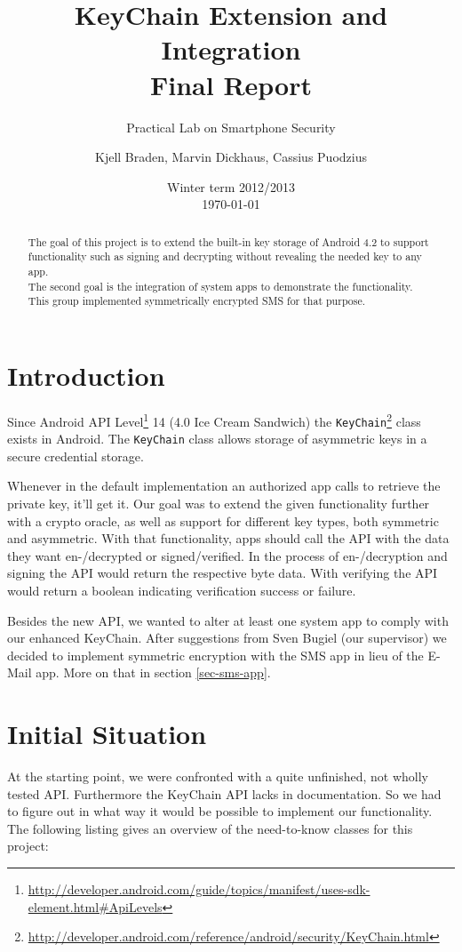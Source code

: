 \documentclass[a4paper,draft]{scrartcl}
\title{KeyChain Extension and Integration\\
	Final Report}
\subtitle{Practical Lab on Smartphone Security}
\author{Kjell Braden, Marvin Dickhaus, Cassius Puodzius}
\date{Winter term 2012/2013\\\today}
\begin{document}
\maketitle

\begin{abstract}
	The goal of this project is to extend the built-in key storage of Android 4.2 to support functionality such as signing and decrypting without revealing the needed key to any app.\\
	The second goal is the integration of system apps to demonstrate the functionality. This group implemented symmetrically encrypted SMS for that purpose.
\end{abstract}

\tableofcontents


\section{Introduction}
	Since Android API Level\footnote{\url{http://developer.android.com/guide/topics/manifest/uses-sdk-element.html\#ApiLevels}} 14 (4.0 Ice Cream Sandwich) the \texttt{KeyChain}\footnote{\url{http://developer.android.com/reference/android/security/KeyChain.html}} class exists in Android. The \texttt{KeyChain} class allows storage of asymmetric keys in a secure credential storage.

	Whenever in the default implementation an authorized app calls to retrieve the private key, it'll get it. Our goal was to extend the given functionality further with a crypto oracle, as well as support for different key types, both symmetric and asymmetric. With that functionality, apps should call the API with the data they want en-/decrypted or signed/verified. In the process of en-/decryption and signing the API would return the respective byte data. With verifying the API would return a boolean indicating verification success or failure.
	
	Besides the new API, we wanted to alter at least one system app to comply with our enhanced KeyChain. After suggestions from Sven Bugiel (our supervisor) we decided to implement symmetric encryption with the SMS app in lieu of the E-Mail app. More on that in section \ref{sec-sms-app}.

\section{Initial Situation}
	At the starting point, we were confronted with a quite unfinished, not wholly tested API. Furthermore the KeyChain API lacks in documentation. So we had to figure out in what way it would be possible to implement our functionality. The following listing gives an overview of the need-to-know classes for this project:
	
\end{document}
